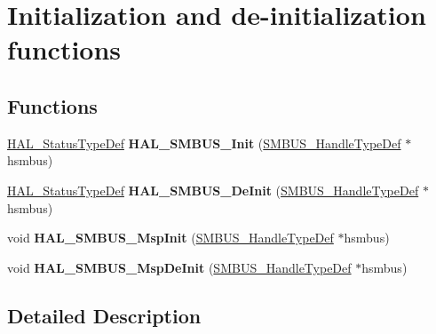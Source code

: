 \hypertarget{group___s_m_b_u_s___exported___functions___group1}{}\section{Initialization and de-\/initialization functions}
\label{group___s_m_b_u_s___exported___functions___group1}
\subsection*{Functions}
\begin{DoxyCompactItemize}
\item 
\mbox{\label{group___s_m_b_u_s___exported___functions___group1_ga94cf51c24051d626d26663f5d34141d4}} 
\hyperlink{stm32f0xx__hal__def_8h_a63c0679d1cb8b8c684fbb0632743478f}{H\+A\+L\+\_\+\+Status\+Type\+Def} {\bfseries H\+A\+L\+\_\+\+S\+M\+B\+U\+S\+\_\+\+Init} (\hyperlink{struct_s_m_b_u_s___handle_type_def}{S\+M\+B\+U\+S\+\_\+\+Handle\+Type\+Def} $\ast$hsmbus)
\item 
\mbox{\label{group___s_m_b_u_s___exported___functions___group1_ga31b2584cdae5c90cfdd49a0bfdc67e8b}} 
\hyperlink{stm32f0xx__hal__def_8h_a63c0679d1cb8b8c684fbb0632743478f}{H\+A\+L\+\_\+\+Status\+Type\+Def} {\bfseries H\+A\+L\+\_\+\+S\+M\+B\+U\+S\+\_\+\+De\+Init} (\hyperlink{struct_s_m_b_u_s___handle_type_def}{S\+M\+B\+U\+S\+\_\+\+Handle\+Type\+Def} $\ast$hsmbus)
\item 
\mbox{\label{group___s_m_b_u_s___exported___functions___group1_ga6d165f7f7953da1cccd983d66df5879b}} 
void {\bfseries H\+A\+L\+\_\+\+S\+M\+B\+U\+S\+\_\+\+Msp\+Init} (\hyperlink{struct_s_m_b_u_s___handle_type_def}{S\+M\+B\+U\+S\+\_\+\+Handle\+Type\+Def} $\ast$hsmbus)
\item 
\mbox{\label{group___s_m_b_u_s___exported___functions___group1_ga9dd1f62881dd6d5063492ca9b688fcbb}} 
void {\bfseries H\+A\+L\+\_\+\+S\+M\+B\+U\+S\+\_\+\+Msp\+De\+Init} (\hyperlink{struct_s_m_b_u_s___handle_type_def}{S\+M\+B\+U\+S\+\_\+\+Handle\+Type\+Def} $\ast$hsmbus)
\end{DoxyCompactItemize}


\subsection{Detailed Description}

